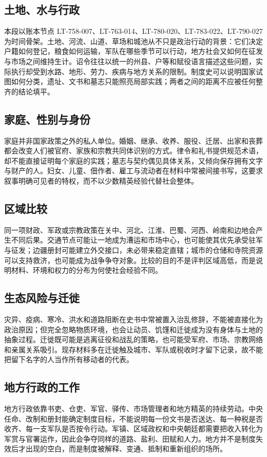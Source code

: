 \subsection{土地、水与行政}
本段以账本节点 LT-758-007、LT-763-014、LT-780-020、LT-783-022、LT-790-027 为时间骨架。土地、河流、山道、草场和城池从不只是政治行动的背景：它们决定户籍如何登记，粮食如何运输，军队在哪些季节可以行动，地方社会又如何在征发与市场之间维持生计。诏令往往以统一的州县、户等和赋役语言描述这些问题，实际执行却受到水路、地形、劳力、疾病与地方关系的限制。制度史可以说明国家试图如何分类，遗址、文书和墓志只能照亮局部实践；两者之间的距离不应被任何整齐的结论填平。

\subsection{家庭、性别与身份}
家庭并非国家政策之外的私人单位。婚姻、继承、收养、服役、迁居、出家和丧葬都会改变人们被官府、家族和宗教共同体识别的方式。律令和礼书提供规范术语，却不能直接证明每个家庭的实践；墓志与契约偶见具体关系，又倾向保存拥有文字与财产的人。妇女、儿童、佃作者、雇工与流动者在材料中常被间接书写，这要求叙事明确可见者的特权，而不以少数精英经验代替社会整体。

\subsection{区域比较}
同一项财政、军政或宗教政策在关中、河北、江淮、巴蜀、河西、岭南和边地会产生不同后果。交通节点可能让一地成为漕运和市场中心，也可能使其优先承受驻军与征发；边疆册封可能建立外交接口，未必带来稳定直辖；城市的仓储和寺院资源可以支持救济，也可能成为战争争夺对象。比较的目的不是评判区域高低，而是说明材料、环境和权力的分布为何使社会经验不同。

\subsection{生态风险与迁徙}
灾异、疫病、寒冷、洪水和道路阻断在史书中常被置入治乱修辞，不能被直接化为政治原因；但完全忽略物质环境，也会让动员、饥馑和迁徙成为没有身体与土地的抽象过程。迁徙既可能是逃离征役和战乱的策略，也可能受军府、市场、宗教网络和亲属关系吸引。现存材料多在迁徙触及城市、军队或税收时才留下记录，故不能把留下名字的人当作所有移动者的代表。

\subsection{地方行政的工作}
地方行政依靠书吏、仓吏、军官、驿传、市场管理者和地方精英的持续劳动。中央任命、改制和册封能确定制度目标，不能说明每一份文书是否送达、每一种税是否收齐、每一支军队是否按令行动。军镇、区域政权和中央朝廷都需要把收入转化为军赏与官署运作，因此会争夺同样的道路、盐利、田赋和人力。地方并不是制度失效后才出现的空白，而是制度被解释、变通、抵制和重新组织的场所。

